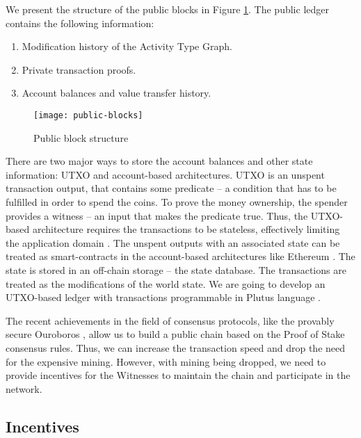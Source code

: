 We present the structure of the public blocks in Figure \ref{fig:publicblocks}. The public ledger contains the following information:
\begin{enumerate}
\item Modification history of the Activity Type Graph.
\item Private transaction proofs.
\item Account balances and value transfer history.
\end{enumerate}

\begin{figure}[ht]
\centering
\texttt{[image: public-blocks]}
\caption{Public block structure}
\label{fig:publicblocks}
\end{figure}

There are two major ways to store the account balances and other state information: UTXO and account-based architectures. UTXO is an unspent transaction output, that contains some predicate -- a condition that has to be fulfilled in order to spend the coins. To prove the money ownership, the spender provides a witness -- an input that makes the predicate true. Thus, the UTXO-based architecture requires the transactions to be stateless, effectively limiting the application domain \cite{bentov2017instantaneous}.  The unspent outputs with an associated state can be treated as smart-contracts in the account-based architectures like Ethereum \cite{wood2014ethereum}. The state is stored in an off-chain storage -- the state database. The transactions are treated as the modifications of the world state. We are going to develop an UTXO-based ledger with transactions programmable in Plutus language \cite{Plutus}.

The recent achievements in the field of consensus protocols, like the provably secure Ouroboros \cite{kiayias2017ouroboros}, allow us to build a public chain based on the Proof of Stake consensus rules. Thus, we can increase the transaction speed and drop the need for the expensive mining. However, with mining being dropped, we need to provide incentives for the Witnesses to maintain the chain and participate in the network.

\subsection{Incentives}

